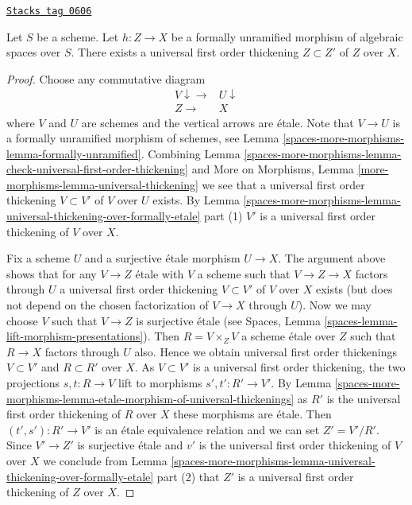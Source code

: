 \begin{lemma}
\label{spaces-more-morphisms-lemma-universal-thickening}
\href{https://stacks.math.columbia.edu/tag/0606}{\texttt{Stacks tag 0606}}

Let $S$ be a scheme.
Let $h : Z \to X$ be a formally unramified morphism of algebraic
spaces over $S$.
There exists a universal first order thickening $Z \subset Z'$ of
$Z$ over $X$.
\end{lemma}

\begin{proof}
Choose any commutative diagram
$$
\begin{array}{cc}V \downarrow\longrightarrow & U \downarrow \\ Z \longrightarrow & X\end{array}
$$
where $V$ and $U$ are schemes and the vertical arrows are \'etale.
Note that $V \to U$ is a formally unramified morphism of schemes, see
Lemma \ref{spaces-more-morphisms-lemma-formally-unramified}.
Combining
Lemma \ref{spaces-more-morphisms-lemma-check-universal-first-order-thickening}
and
More on Morphisms, Lemma \ref{more-morphisms-lemma-universal-thickening}
we see that a universal first order thickening $V \subset V'$
of $V$ over $U$ exists. By
Lemma \ref{spaces-more-morphisms-lemma-universal-thickening-over-formally-etale} part (1)
$V'$ is a universal first order thickening of $V$ over $X$.

\medskip\noindent
Fix a scheme $U$ and a surjective \'etale morphism $U \to X$.
The argument above shows that for any $V \to Z$ \'etale with $V$
a scheme such that $V \to Z \to X$ factors through $U$ a
universal first order thickening $V \subset V'$ of $V$ over $X$
exists (but does not depend on the chosen factorization of $V \to X$
through $U$). Now we may choose $V$ such that $V \to Z$ is surjective
\'etale (see
Spaces, Lemma \ref{spaces-lemma-lift-morphism-presentations}).
Then $R = V \times_Z V$ a scheme \'etale over $Z$ such that
$R \to X$ factors through $U$ also.
Hence we obtain universal first order thickenings
$V \subset V'$ and $R \subset R'$ over $X$.
As $V \subset V'$ is a universal first order thickening,
the two projections $s, t : R \to V$ lift to morphisms
$s', t': R' \to V'$. By
Lemma \ref{spaces-more-morphisms-lemma-etale-morphism-of-universal-thickenings}
as $R'$ is the universal first order thickening of $R$ over $X$
these morphisms are \'etale.
Then $(t', s') : R' \to V'$ is an \'etale equivalence relation
and we can set $Z' = V'/R'$. Since $V' \to Z'$ is surjective \'etale
and $v'$ is the universal first order thickening of $V$ over $X$
we conclude from
Lemma \ref{spaces-more-morphisms-lemma-universal-thickening-over-formally-etale} part (2)
that $Z'$ is a universal first order thickening of $Z$ over $X$.
\end{proof}

